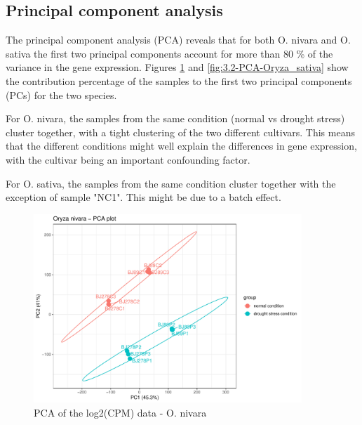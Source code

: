 \subsection{Principal component analysis}

The principal component analysis (PCA) reveals that for both O. nivara and O. sativa the first two principal components account for more than 80 \% of the variance in the gene expression. Figures  \ref{fig:3.2-PCA-Oryza_nivara} and \ref{fig:3.2-PCA-Oryza_sativa} show the contribution percentage of the samples to the first two principal components (PCs) for the two species.

For O. nivara, the samples from the same condition (normal vs drought stress) cluster together, with a tight clustering of the two different cultivars. This means that the different conditions might well explain the differences in gene expression, with the cultivar being an important confounding factor.

For O. sativa, the samples from the same condition cluster together with the exception of sample "NC1". This might be due to a batch effect.

\begin{figure}[htbp]
    \caption{PCA of the log2(CPM) data - O. nivara}
    \label{fig:3.2-PCA-Oryza_nivara}
    \includegraphics[width=0.9\textwidth]{../../results/plots-and-tables/3.2-PCA-Oryza_nivara}
\end{figure}

